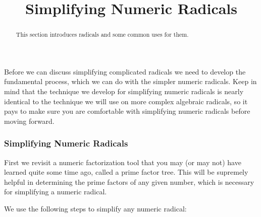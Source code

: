 \documentclass{ximera}
\title{Simplifying Numeric Radicals}
\begin{document}
\begin{abstract}
    This section introduces radicals and some common uses for them.
\end{abstract}
\maketitle

Before we can discuss simplifying complicated radicals we need to develop the fundamental process, which we can do with the simpler numeric radicals. Keep in mind that the technique we develop for simplifying numeric radicals is nearly identical to the technique we will use on more complex algebraic radicals, so it pays to make sure you are comfortable with simplifying numeric radicals before moving forward. 

\subsubsection*{Simplifying Numeric Radicals}
    First we revisit a numeric factorization tool that you may (or may not) have learned quite some time ago, called a prime factor tree. This will be supremely helpful in determining the prime factors of any given number, which is necessary for simplifying a numeric radical. 
    
    We use the following steps to simplify any numeric radical:
\end{document}
